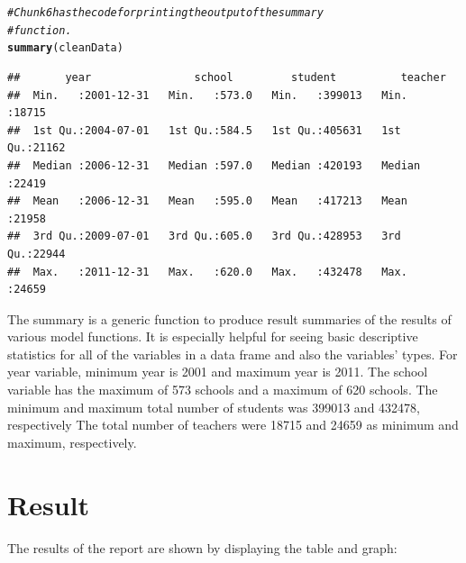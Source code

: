 \documentclass{article}\usepackage[]{graphicx}\usepackage[]{color}
\makeatletter
\newcommand{\hlcom}[1]{\textcolor[rgb]{0.678,0.584,0.686}{\textit{#1}}}%
\newcommand{\hlstd}[1]{\textcolor[rgb]{0.345,0.345,0.345}{#1}}%
\newcommand{\hlkwd}[1]{\textcolor[rgb]{0.737,0.353,0.396}{\textbf{#1}}}%
\newenvironment{kframe}{%
 \def\at@end@of@kframe{}%
 \ifinner\ifhmode%
  \def\at@end@of@kframe{\end{minipage}}%
  \begin{minipage}{\columnwidth}%
 \fi\fi%
 \def\FrameCommand##1{\hskip\@totalleftmargin \hskip-\fboxsep
 \colorbox{shadecolor}{##1}\hskip-\fboxsep
     \hskip-\linewidth \hskip-\@totalleftmargin \hskip\columnwidth}%
 \MakeFramed {\advance\hsize-\width
   \@totalleftmargin\z@ \linewidth\hsize
   \@setminipage}}%
 {\par\unskip\endMakeFramed%
 \at@end@of@kframe}
\newenvironment{knitrout}{}{} %
\makeatother
\begin{document}
\begin{enumerate}
\begin{knitrout}
\color{fgcolor}\begin{kframe}
\begin{alltt}
\hlcom{# Chunk6 has the code for printing the output of the summary}
\hlcom{# function.}
\hlkwd{summary}\hlstd{(cleanData)}
\end{alltt}
\begin{verbatim}
##       year                school         student          teacher     
##  Min.   :2001-12-31   Min.   :573.0   Min.   :399013   Min.   :18715  
##  1st Qu.:2004-07-01   1st Qu.:584.5   1st Qu.:405631   1st Qu.:21162  
##  Median :2006-12-31   Median :597.0   Median :420193   Median :22419  
##  Mean   :2006-12-31   Mean   :595.0   Mean   :417213   Mean   :21958  
##  3rd Qu.:2009-07-01   3rd Qu.:605.0   3rd Qu.:428953   3rd Qu.:22944  
##  Max.   :2011-12-31   Max.   :620.0   Max.   :432478   Max.   :24659
\end{verbatim}
\end{kframe}
\end{knitrout}

The summary is a generic function to produce result summaries of the results of various model functions. It is especially helpful for seeing basic descriptive statistics for all of the variables in a data frame and also the variables’ types. For year variable, minimum year is 2001 and maximum year is 2011. The school variable has the maximum of 573 schools  and a maximum of 620 schools. The minimum and maximum total number of students was 399013 and 432478, respectively The total number of teachers were 18715 and 24659 as minimum and maximum, respectively.

\end {enumerate}

\section {Result}
The results of the report are shown by displaying the table and graph:
\end{document}
